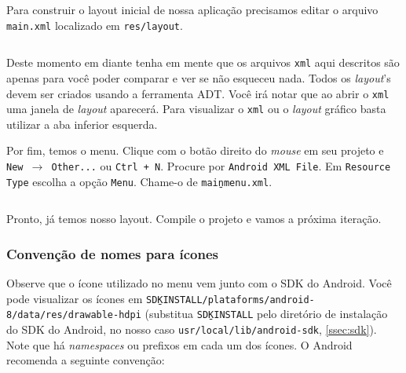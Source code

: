 Para construir o layout inicial de nossa aplicação precisamos editar o arquivo \texttt{main.xml} localizado em
\texttt{res/layout}.

\begin{listing}[H]
  \inputminted[linenos=true,frame=bottomline,tabsize=3]{ xml }{ source/main-1.xml }
  \caption{Layout principal [res/layout/main.xml]}
\end{listing}

Deste momento em diante tenha em mente que os arquivos \texttt{\gls{xml}} aqui descritos são apenas para
você poder comparar e ver se não esqueceu nada. Todos os \textit{layout}'s devem ser criados usando a
ferramenta ADT. Você irá notar que ao abrir o \texttt{xml} uma janela de \textit{layout} aparecerá.
Para visualizar o \texttt{xml} ou o \textit{layout} gráfico basta utilizar a aba inferior esquerda.

Por fim, temos o menu. Clique com o botão direito do \textit{mouse} em seu projeto e \texttt{New
$\rightarrow$ Other...} ou \texttt{Ctrl + N}. Procure por \texttt{Android XML File}. Em \texttt{Resource
Type} escolha a opção \texttt{Menu}. Chame-o de \texttt{main\b{ }menu.xml}.

\begin{listing}[H]
  \inputminted[linenos=true,frame=bottomline,tabsize=3]{ xml }{ source/main_menu-1.xml }
  \caption{Menu principal [res/menu/main\b{ }menu.xml]}
\end{listing}

Pronto, já temos nosso layout. Compile o projeto e vamos a próxima iteração.

\subsubsection{Convenção de nomes para ícones\label{sssec:nomeicones}}

Observe que o ícone utilizado no menu vem junto com o SDK do Android. Você pode visualizar os
ícones em \texttt{SDK\b{ }INSTALL/plataforms/android-8/data/res/drawable-hdpi}
(substitua \texttt{SDK\b{ }INSTALL} pelo diretório de instalação do SDK do Android, no nosso caso
\texttt{usr/local/lib/android-sdk}, \ref{ssec:sdk}). Note que há \textit{namespaces} ou prefixos em
cada um dos ícones. O Android recomenda a seguinte convenção:

